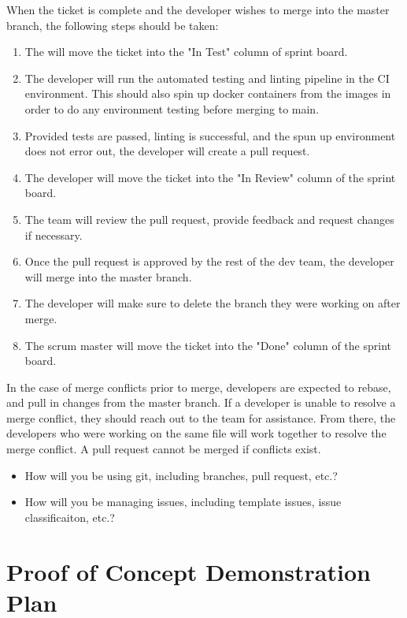 \documentclass{article}
\begin{document}
When the ticket is complete and the developer wishes to merge into the master branch, the following steps should be taken:
\begin{enumerate}
	\item The will move the ticket into the "In Test" column of sprint board.
	\item The developer will run the automated testing and linting pipeline in the CI environment.
	This should also spin up docker containers from the images in order to do any environment testing before merging to main.
	\item Provided tests are passed, linting is successful, and the spun up environment does not error out, the developer will create a pull request.
	\item The developer will move the ticket into the "In Review" column of the sprint board.
	\item The team will review the pull request, provide feedback and request changes if necessary. 
	\item Once the pull request is approved by the rest of the dev team, the developer will merge into the master branch.
	\item The developer will make sure to delete the branch they were working on after merge.
	\item The scrum master will move the ticket into the "Done" column of the sprint board.
\end{enumerate}

In the case of merge conflicts prior to merge, developers are expected to rebase, and pull in changes from the master branch.
If a developer is unable to resolve a merge conflict, they should reach out to the team for assistance. 
From there, the developers who were working on the same file will work together to resolve the merge conflict. 
A pull request cannot be merged if conflicts exist.\\

\begin{itemize}
	\item How will you be using git, including branches, pull request, etc.?
	\item How will you be managing issues, including template issues, issue
	classificaiton, etc.?
\end{itemize}

\section{Proof of Concept Demonstration Plan}
\end{document}
